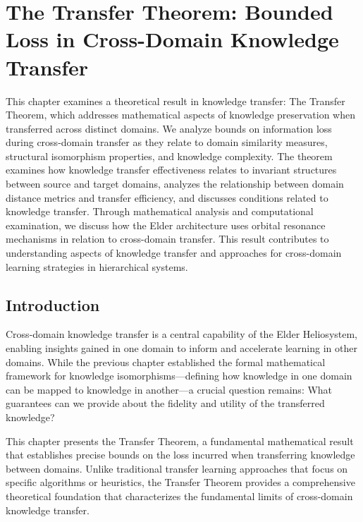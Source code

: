 \chapter{The Transfer Theorem: Bounded Loss in Cross-Domain Knowledge Transfer}

\begin{tcolorbox}[colback=blue!5!white,colframe=blue!75!black,title=Chapter Summary]
This chapter examines a theoretical result in knowledge transfer: The Transfer Theorem, which addresses mathematical aspects of knowledge preservation when transferred across distinct domains. We analyze bounds on information loss during cross-domain transfer as they relate to domain similarity measures, structural isomorphism properties, and knowledge complexity. The theorem examines how knowledge transfer effectiveness relates to invariant structures between source and target domains, analyzes the relationship between domain distance metrics and transfer efficiency, and discusses conditions related to knowledge transfer. Through mathematical analysis and computational examination, we discuss how the Elder architecture uses orbital resonance mechanisms in relation to cross-domain transfer. This result contributes to understanding aspects of knowledge transfer and approaches for cross-domain learning strategies in hierarchical systems.
\end{tcolorbox}

\section{Introduction}

Cross-domain knowledge transfer is a central capability of the Elder Heliosystem, enabling insights gained in one domain to inform and accelerate learning in other domains. While the previous chapter established the formal mathematical framework for knowledge isomorphisms—defining how knowledge in one domain can be mapped to knowledge in another—a crucial question remains: What guarantees can we provide about the fidelity and utility of the transferred knowledge?

This chapter presents the Transfer Theorem, a fundamental mathematical result that establishes precise bounds on the loss incurred when transferring knowledge between domains. Unlike traditional transfer learning approaches that focus on specific algorithms or heuristics, the Transfer Theorem provides a comprehensive theoretical foundation that characterizes the fundamental limits of cross-domain knowledge transfer.

